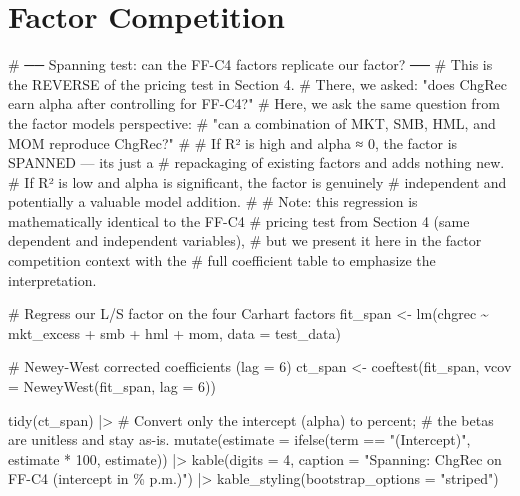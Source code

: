 \documentclass[
  letterpaper,
  DIV=11,
  numbers=noendperiod]{scrartcl}
\newenvironment{Shaded}{\begin{snugshade}}{\end{snugshade}}
\newcommand{\AttributeTok}[1]{\textcolor[rgb]{0.40,0.45,0.13}{#1}}
\newcommand{\CommentTok}[1]{\textcolor[rgb]{0.37,0.37,0.37}{#1}}
\newcommand{\DecValTok}[1]{\textcolor[rgb]{0.68,0.00,0.00}{#1}}
\newcommand{\FunctionTok}[1]{\textcolor[rgb]{0.28,0.35,0.67}{#1}}
\newcommand{\NormalTok}[1]{\textcolor[rgb]{0.00,0.23,0.31}{#1}}
\newcommand{\OtherTok}[1]{\textcolor[rgb]{0.00,0.23,0.31}{#1}}
\newcommand{\SpecialCharTok}[1]{\textcolor[rgb]{0.37,0.37,0.37}{#1}}
\newcommand{\StringTok}[1]{\textcolor[rgb]{0.13,0.47,0.30}{#1}}
\begin{document}
\section{Factor Competition}\label{factor-competition}

\begin{Shaded}
\begin{Highlighting}[]
\CommentTok{\# ── Spanning test: can the FF{-}C4 factors replicate our factor? ──}
\CommentTok{\# This is the REVERSE of the pricing test in Section 4.}
\CommentTok{\# There, we asked: "does ChgRec earn alpha after controlling for FF{-}C4?"}
\CommentTok{\# Here, we ask the same question from the factor model\textquotesingle{}s perspective:}
\CommentTok{\# "can a combination of MKT, SMB, HML, and MOM reproduce ChgRec?"}
\CommentTok{\#}
\CommentTok{\# If R² is high and alpha ≈ 0, the factor is SPANNED — it\textquotesingle{}s just a}
\CommentTok{\# repackaging of existing factors and adds nothing new.}
\CommentTok{\# If R² is low and alpha is significant, the factor is genuinely}
\CommentTok{\# independent and potentially a valuable model addition.}
\CommentTok{\#}
\CommentTok{\# Note: this regression is mathematically identical to the FF{-}C4}
\CommentTok{\# pricing test from Section 4 (same dependent and independent variables),}
\CommentTok{\# but we present it here in the factor competition context with the}
\CommentTok{\# full coefficient table to emphasize the interpretation.}

\CommentTok{\# Regress our L/S factor on the four Carhart factors}
\NormalTok{fit\_span }\OtherTok{\textless{}{-}} \FunctionTok{lm}\NormalTok{(chgrec }\SpecialCharTok{\textasciitilde{}}\NormalTok{ mkt\_excess }\SpecialCharTok{+}\NormalTok{ smb }\SpecialCharTok{+}\NormalTok{ hml }\SpecialCharTok{+}\NormalTok{ mom, }\AttributeTok{data =}\NormalTok{ test\_data)}

\CommentTok{\# Newey{-}West corrected coefficients (lag = 6)}
\NormalTok{ct\_span }\OtherTok{\textless{}{-}} \FunctionTok{coeftest}\NormalTok{(fit\_span, }\AttributeTok{vcov =} \FunctionTok{NeweyWest}\NormalTok{(fit\_span, }\AttributeTok{lag =} \DecValTok{6}\NormalTok{))}

\FunctionTok{tidy}\NormalTok{(ct\_span) }\SpecialCharTok{|\textgreater{}}
  \CommentTok{\# Convert only the intercept (alpha) to percent;}
  \CommentTok{\# the betas are unitless and stay as{-}is.}
  \FunctionTok{mutate}\NormalTok{(}\AttributeTok{estimate =} \FunctionTok{ifelse}\NormalTok{(term }\SpecialCharTok{==} \StringTok{"(Intercept)"}\NormalTok{, estimate }\SpecialCharTok{*} \DecValTok{100}\NormalTok{, estimate)) }\SpecialCharTok{|\textgreater{}}
  \FunctionTok{kable}\NormalTok{(}\AttributeTok{digits =} \DecValTok{4}\NormalTok{,}
        \AttributeTok{caption =} \StringTok{"Spanning: ChgRec on FF{-}C4 (intercept in \% p.m.)"}\NormalTok{) }\SpecialCharTok{|\textgreater{}}
  \FunctionTok{kable\_styling}\NormalTok{(}\AttributeTok{bootstrap\_options =} \StringTok{"striped"}\NormalTok{)}
\end{Highlighting}
\end{Shaded}
\end{document}
